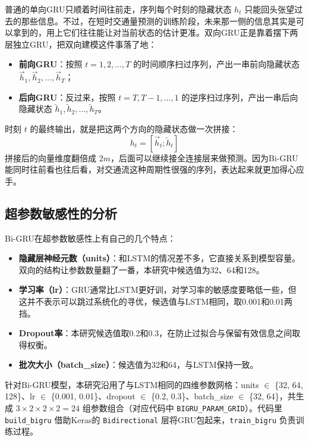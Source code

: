 \documentclass[12pt,a4paper,oneside]{ctexbook}
\begin{document}
	普通的单向GRU只顺着时间往前走，序列每个时刻的隐藏状态 $h_t$ 只能回头张望过去的那些信息。不过，在短时交通量预测的训练阶段，未来那一侧的信息其实是可以拿到的，用上它们往往能让对当前状态的估计更准。双向GRU正是靠着摆下两层独立GRU，把双向建模这件事落了地：
	
	\begin{itemize}
		\item \textbf{前向GRU}：按照 $t=1,2,\ldots,T$ 的时间顺序扫过序列，产出一串前向隐藏状态 $\overrightarrow{h}_1, \overrightarrow{h}_2, \ldots, \overrightarrow{h}_T$；
		\item \textbf{后向GRU}：反过来，按照 $t=T,T-1,\ldots,1$ 的逆序扫过序列，产出一串后向隐藏状态 $\overleftarrow{h}_1, \overleftarrow{h}_2, \ldots, \overleftarrow{h}_T$。
	\end{itemize}
	
	时刻 $t$ 的最终输出，就是把这两个方向的隐藏状态做一次拼接：
	\[
	h_t = [\overrightarrow{h}_t; \overleftarrow{h}_t]
	\]
	拼接后的向量维度翻倍成 $2m$，后面可以继续接全连接层来做预测。因为Bi-GRU能同时往前看也往后看，对交通流这种周期性很强的序列，表达起来就更加得心应手。
	
	\subsection{超参数敏感性的分析}
	
	Bi-GRU在超参数敏感性上有自己的几个特点：
	
	\begin{itemize}
		\item \textbf{隐藏层神经元数（units）}：和LSTM的情况差不多，它直接关系到模型容量。双向的结构让参数数量翻了一番，本研究中候选值为32、64和128。
		\item \textbf{学习率（lr）}：GRU通常比LSTM更好训，对学习率的敏感度要略低一些，但这并不表示可以跳过系统化的寻优，候选值与LSTM相同，取0.001和0.01两挡。
		\item \textbf{Dropout率}：本研究候选值取0.2和0.3，在防止过拟合与保留有效信息之间取得权衡。
		\item \textbf{批次大小（batch\_size）}：候选值为32和64，与LSTM保持一致。
	\end{itemize}

	针对Bi-GRU模型，本研究沿用了与LSTM相同的四维参数网格：units $\in$ \{32, 64, 128\}、lr $\in$ \{0.001, 0.01\}、dropout $\in$ \{0.2, 0.3\}、batch\_size $\in$ \{32, 64\}，共生成 $3\times2\times2\times2=24$ 组参数组合（对应代码中 \texttt{BIGRU\_PARAM\_GRID}）。代码里 \texttt{build\_bigru} 借助Keras的 \texttt{Bidirectional} 层将GRU包起来，\texttt{train\_bigru} 负责训练过程。
	
\end{document}
